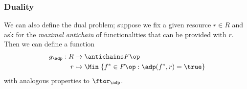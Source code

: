 %
%




\subsubsection{Duality}

We can also define the dual problem; suppose we fix a given resource $r \in R$ and ask for the \emph{maximal antichain} of functionalities that can be provided with $r$.
Then we can define a function
\begin{equation}
	\begin{aligned}
		g_\adp : R & \to \antichains F\op                                      \\
		r          & \mapsto \Min \; \{ f^* \in F\op : \adp(f^*, r) = \true \}
	\end{aligned}
\end{equation}
with analogous properties to $\ftor_\adp$.


